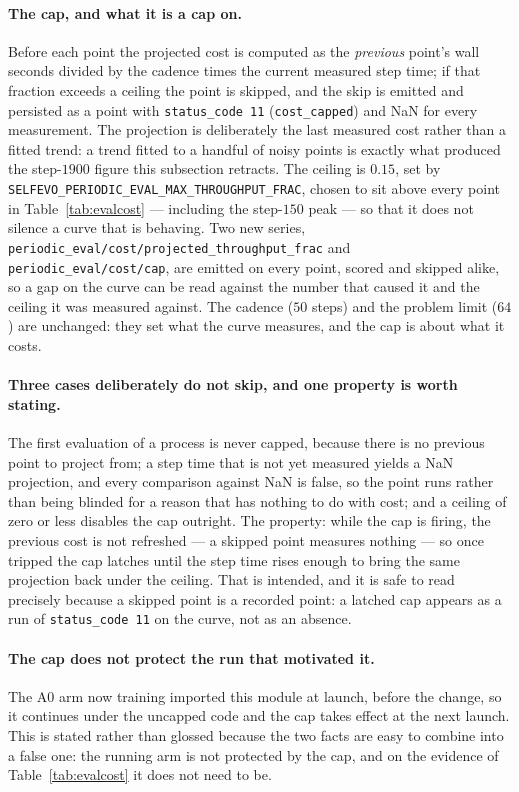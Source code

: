 \paragraph{The cap, and what it is a cap on.} Before each point the projected cost is computed
as the \emph{previous} point's wall seconds divided by the cadence times the current measured
step time; if that fraction exceeds a ceiling the point is skipped, and the skip is emitted and
persisted as a point with \texttt{status\_code 11} (\texttt{cost\_capped}) and NaN for every
measurement. The projection is deliberately the last measured cost rather than a fitted trend:
a trend fitted to a handful of noisy points is exactly what produced the step-$1900$ figure
this subsection retracts. The ceiling is $0.15$, set by
\texttt{SELFEVO\_PERIODIC\_\allowbreak EVAL\_MAX\_\allowbreak THROUGHPUT\_FRAC}, chosen to sit above every point in
Table~\ref{tab:evalcost} --- including the step-$150$ peak --- so that it does not silence a
curve that is behaving. Two new series,
\texttt{periodic\_eval/\allowbreak cost/\allowbreak projected\_throughput\_frac} and
\texttt{periodic\_eval/cost/cap}, are emitted on every point, scored and skipped alike, so a
gap on the curve can be read against the number that caused it and the ceiling it was measured
against. The cadence ($50$ steps) and the problem limit ($64$) are unchanged: they set what the
curve measures, and the cap is about what it costs.

\paragraph{Three cases deliberately do not skip, and one property is worth stating.} The first
evaluation of a process is never capped, because there is no previous point to project from; a
step time that is not yet measured yields a NaN projection, and every comparison against NaN is
false, so the point runs rather than being blinded for a reason that has nothing to do with
cost; and a ceiling of zero or less disables the cap outright. The property: while the cap is
firing, the previous cost is not refreshed --- a skipped point measures nothing --- so once
tripped the cap latches until the step time rises enough to bring the same projection back
under the ceiling. That is intended, and it is safe to read precisely because a skipped point
is a recorded point: a latched cap appears as a run of \texttt{status\_code 11} on the curve,
not as an absence.

\paragraph{The cap does not protect the run that motivated it.} The A0 arm now training imported
this module at launch, before the change, so it continues under the uncapped code and the cap
takes effect at the next launch. This is stated rather than glossed because the two facts are
easy to combine into a false one: the running arm is not protected by the cap, and on the
evidence of Table~\ref{tab:evalcost} it does not need to be.

